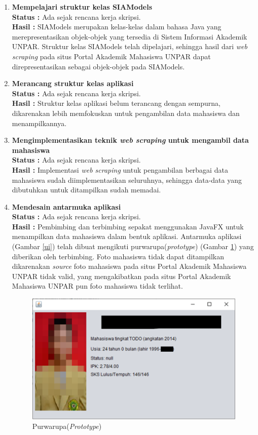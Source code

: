 \documentclass[a4paper,twoside]{article}
\begin{document}
\begin{enumerate}
        \item \textbf{Mempelajari struktur kelas SIAModels}\\
		{\bf Status :} Ada sejak rencana kerja skripsi.\\
		{\bf Hasil :} SIAModels merupakan kelas-kelas dalam bahasa Java yang merepresentasikan objek-objek yang tersedia di Sistem Informasi Akademik UNPAR.
		Struktur kelas SIAModels telah dipelajari, sehingga hasil dari \textit{web scraping} pada situs Portal Akademik Mahasiswa UNPAR dapat direpresentasikan sebagai objek-objek pada SIAModels.
		
		
		\item \textbf{Merancang struktur kelas aplikasi}\\
		{\bf Status :} Ada sejak rencana kerja skripsi.\\
		{\bf Hasil :} Struktur kelas aplikasi belum terancang dengan sempurna, dikarenakan lebih memfokuskan untuk pengambilan data mahasiswa dan menampilkannya.
		
		
		\item \textbf{Mengimplementasikan teknik \textit{web scraping} untuk mengambil data mahasiswa}\\
		{\bf Status :} Ada sejak rencana kerja skripsi.\\
		{\bf Hasil :} Implementasi \textit{web scraping} untuk pengambilan berbagai data mahasiswa sudah diimplementasikan seluruhnya, sehingga data-data yang dibutuhkan untuk ditampilkan sudah memadai.
		
		
		\item \textbf{Mendesain antarmuka aplikasi}\\
		{\bf Status :} Ada sejak rencana kerja skripsi.\\
		{\bf Hasil :} Pembimbing dan terbimbing sepakat menggunakan JavaFX untuk menampilkan data mahasiswa dalam bentuk aplikasi. Antarmuka aplikasi (Gambar \ref{ui}) telah dibuat mengikuti purwarupa(\textit{prototype}) (Gambar \ref{purwarupa}) yang diberikan oleh terbimbing. Foto mahasiswa tidak dapat ditampilkan dikarenakan \textit{source} foto mahasiswa pada situs Portal Akademik Mahasiswa UNPAR tidak valid, yang mengakibatkan pada situs Portal Akademik Mahasiswa UNPAR pun foto mahasiswa tidak terlihat.
		
		\begin{figure}[H]
        	\centering
        	\includegraphics{prototype.png}
        	\caption{Purwarupa(\textit{Prototype})} 
        	\label{purwarupa}
        \end{figure}
        

\end{enumerate}
\end{document}
